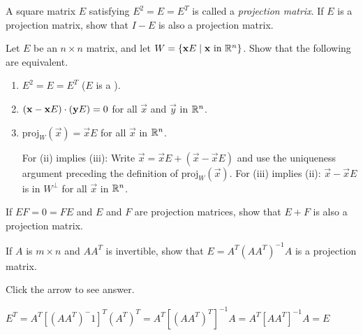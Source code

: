 \documentclass{ximera}
\begin{document}
\begin{problem}\label{prob:8_1_17.2}
A square matrix $E$ satisfying $E^2=E=E^T$ is called a \emph{projection matrix}.  If $E$ is a projection matrix, show that $I - E$ is also a projection matrix.
\end{problem}


\begin{problem}\label{prob:8_1_17.1}
\item Let $E$ be an $n \times n$ matrix, and let $W = \{\mathbf{x} E \mid \mathbf{x} \mbox{ in } \mathbb{R}^n\}$. Show that the following are equivalent.


\begin{enumerate}
\item $E^{2} = E = E^{T}$ ($E$ is a ).

\item $(\mathbf{x} - \mathbf{x}E) \cdot (\mathbf{y}E) = 0$ for all $\vec{x}$ and $\vec{y}$ in $\mathbb{R}^n$.

\item $\mbox{proj}_W(\vec{x}) = \vec{x}E$ for all $\vec{x}$ in $\mathbb{R}^n$.
\begin{hint}
For (ii) implies (iii): Write $\vec{x} = \vec{x}E + (\vec{x} - \vec{x}E)$ and use the uniqueness argument preceding the definition of $\mbox{proj}_W(\vec{x})$. For (iii) implies (ii): $\vec{x} - \vec{x}E$ is in $W^\perp$ for all $\vec{x}$ in $\mathbb{R}^n$.
\end{hint}
\end{enumerate}
\end{problem}



\begin{problem}\label{prob:8_1_17.3}
If $EF = 0 = FE$ and $E$ and $F$ are projection matrices, show that $E + F$ is also a projection matrix.

\end{problem}

\begin{problem}\label{prob:8_1_17.4}
If $A$ is $m \times n$ and $AA^{T}$ is invertible, show that $E = A^{T}(AA^{T})^{-1}A$ is a projection matrix.

Click the arrow to see answer.

\begin{expandable}
    $E^T = A^T[(AA^T)^-1]^T(A^T)^T  = A^T[(AA^T)^T]^{-1}A = A^T[AA^T]^{-1}A = E$
\end{expandable}

\end{problem}
\end{document}
